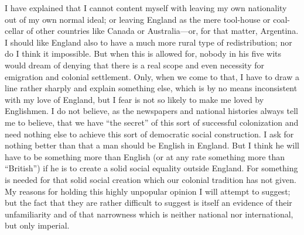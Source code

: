 \documentclass{book}
\begin{document}
I have explained that I cannot content myself with leaving my own nationality out of my own normal ideal; or leaving England as the mere tool-house or coal-cellar of other countries like Canada or Australia—or, for that matter, Argentina. I should like England also to have a much more rural type of redistribution; nor do I think it impossible. But when this is allowed for, nobody in his five wits would dream of denying that there is a real scope and even necessity for emigration and colonial settlement. Only, when we come to that, I have to draw a line rather sharply and explain something else, which is by no means inconsistent with my love of England, but I fear is not so likely to make me loved by Englishmen. I do not believe, as the newspapers and national histories always tell me to believe, that we have “the secret” of this sort of successful colonization and need nothing else to achieve this sort of democratic social construction. I ask for nothing better than that a man should be English in England. But I think he will have to be something more than English (or at any rate something more than “British”) if he is to create a solid social equality outside England. For something is needed for that solid social creation which our colonial tradition has not given. My reasons for holding this highly unpopular opinion I will attempt to suggest; but the fact that they are rather difficult to suggest is itself an evidence of their unfamiliarity and of that narrowness which is neither national nor international, but only imperial.
\end{document}
